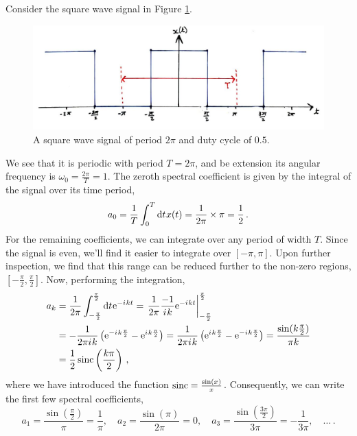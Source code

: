 \begin{exmp}
  Consider the square wave signal in Figure \ref{fig::lecture_4_square_wave}.
  \begin{figure}[!htb]
    \includegraphics[width=\textwidth]{images/lecture_4_square_wave.JPG}
    \caption{
      A square wave signal of period $2\pi$ and duty cycle of $0.5$.
    }
    \label{fig::lecture_4_square_wave}
  \end{figure}
  We see that it is periodic with period $T = 2\pi$, and be extension its
  angular frequency is $\omega_0 = \frac{2\pi}{T} = 1$. The zeroth spectral
  coefficient is given by the integral of the signal over its time period,
  \begin{displaymath}
    a_0 = \frac{1}{T}\int_0^T\mathrm{d}t\mkern1mu x(t) = \frac{1}{2\pi}\times\pi = \frac{1}{2} \,.
  \end{displaymath}
  For the remaining coefficients, we can integrate over any period of width $T$.
  Since the signal is even, we'll find it easier to integrate over $[-\pi,\pi]$.
  Upon further inspection, we find that this range can be reduced further to
  the non-zero regions, $[-\frac{\pi}{2},\frac{\pi}{2}]$. Now, performing the
  integration,
  \begin{align*}
    a_k &= \frac{1}{2\pi}\int_{-\frac{\pi}{2}}^{\frac{\pi}{2}} \mathrm{d}t\mkern1mu\mathrm{e}^{-{i\mkern1mu} kt}
    = \left.\frac{1}{2\pi}\frac{-1}{{i\mkern1mu} k}\mathrm{e}^{-{i\mkern1mu} kt}\right|_{-\frac{\pi}{2}}^{\frac{\pi}{2}} \\
    &= -\frac{1}{2\pi{i\mkern1mu} k}\left(\mathrm{e}^{-{i\mkern1mu} k\frac{\pi}{2}} - \mathrm{e}^{{i\mkern1mu} k\frac{\pi}{2}}\right)
    = \frac{1}{2\pi{i\mkern1mu} k}\left(\mathrm{e}^{{i\mkern1mu} k\frac{\pi}{2}} - \mathrm{e}^{-{i\mkern1mu} k\frac{\pi}{2}}\right)
    = \frac{\sin(k\frac{\pi}{2})}{\pi k} \\
    &= \frac{1}{2}\operatorname{sinc}\left(\frac{k\pi}{2}\right) \,,
  \end{align*}
  where we have introduced the function $\operatorname{sinc} = \frac{\sin(x)}{x}$. Consequently,
  we can write the first few spectral coefficients,
  \begin{displaymath}
    a_1 = \frac{\sin\left(\frac{\pi}{2}\right)}{\pi} = \frac{1}{\pi}, \quad
    a_2 = \frac{\sin(\pi)}{2\pi} = 0, \quad
    a_3 = \frac{\sin\left(\frac{3\pi}{2}\right)}{3\pi} = -\frac{1}{3\pi}, \quad\hdots \,.
  \end{displaymath}
\end{exmp}
